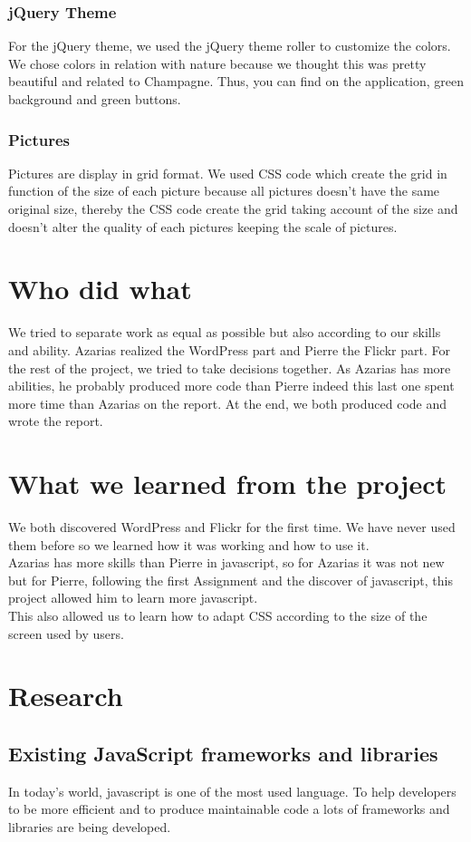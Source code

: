 \documentclass[12pt]{report}%
\begin{document}
\subsection{jQuery Theme}
For the jQuery theme, we used the jQuery theme roller to customize the colors. We chose colors in relation with nature because we thought this was pretty beautiful and related to Champagne. Thus, you can find on the application,  green background and green buttons.
\subsection{Pictures}
Pictures are display in grid format. We used CSS code which create the grid in function of the size of each picture because all pictures doesn't have the same original size, thereby the CSS code create the grid taking account of the size and doesn't alter the quality of each pictures keeping the scale of pictures.

\chapter{Who did what}
We tried to separate work as equal as possible but also according to our skills and ability. Azarias realized the WordPress part and Pierre the Flickr part. For the rest of the project, we tried to take decisions together. As Azarias has more abilities, he probably produced more code than Pierre indeed this last one spent more time than Azarias on the report. At the end, we both produced code and wrote the report. 

\chapter{What we learned from the project}
We both discovered WordPress and Flickr for the first time. We have never used them before so we learned how it was working and how to use it.\\
Azarias has more skills than Pierre in javascript, so for Azarias it was not new but for Pierre, following the first Assignment and the discover of javascript, this project allowed him to learn more javascript.\\
This also allowed us to learn how to adapt CSS according to the size of the screen used by users. 

\chapter{Research}
\section{Existing JavaScript frameworks and libraries}
In today's world, javascript is one of the most used language. To help developers to be more efficient and to produce maintainable code a lots of frameworks and libraries are being developed. 
\end{document}
